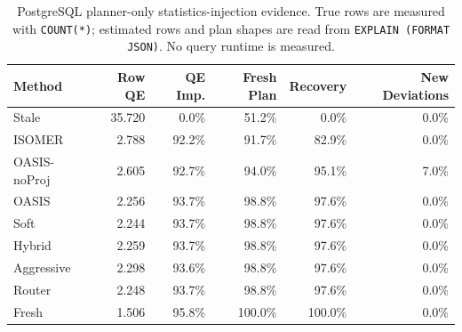 \begin{table}[t]
  \centering
  \small
  \caption{PostgreSQL planner-only statistics-injection evidence. True rows are measured with \texttt{COUNT(*)}; estimated rows and plan shapes are read from \texttt{EXPLAIN (FORMAT JSON)}. No query runtime is measured.}
  \label{tab:postgres_planner_stats_injection}
  \setlength{\tabcolsep}{4pt}
  \begin{tabular}{lrrrrr}
    \toprule
    Method & Row QE & QE Imp. & Fresh Plan & Recovery & New Deviations \\
    \midrule
    Stale & 35.720 & 0.0\% & 51.2\% & 0.0\% & 0.0\% \\
    ISOMER & 2.788 & 92.2\% & 91.7\% & 82.9\% & 0.0\% \\
    OASIS-noProj & 2.605 & 92.7\% & 94.0\% & 95.1\% & 7.0\% \\
    OASIS & 2.256 & 93.7\% & 98.8\% & 97.6\% & 0.0\% \\
    Soft & 2.244 & 93.7\% & 98.8\% & 97.6\% & 0.0\% \\
    Hybrid & 2.259 & 93.7\% & 98.8\% & 97.6\% & 0.0\% \\
    Aggressive & 2.298 & 93.6\% & 98.8\% & 97.6\% & 0.0\% \\
    Router & 2.248 & 93.7\% & 98.8\% & 97.6\% & 0.0\% \\
    Fresh & 1.506 & 95.8\% & 100.0\% & 100.0\% & 0.0\% \\
    \bottomrule
  \end{tabular}
\end{table}
